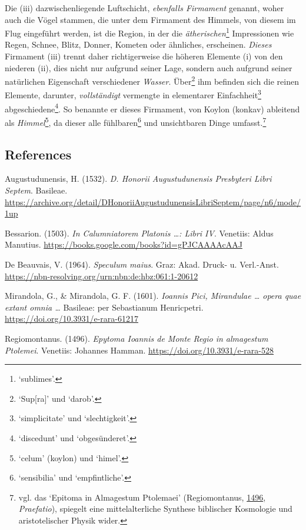 \documentclass[
]{article}
\begin{document}
Die (iii) dazwischenliegende Luftschicht, \emph{ebenfalls Firmament}
genannt, woher auch die Vögel stammen, die unter dem Firmament des
Himmels, von diesem im Flug eingeführt werden, ist die Region, in der
die \emph{ätherischen}\footnote{`sublimes'.} Impressionen wie Regen,
Schnee, Blitz, Donner, Kometen oder ähnliches, erscheinen. \emph{Dieses}
Firmament (iii) trennt daher richtigerweise die höheren Elemente (i) von
den niederen (ii), dies nicht nur aufgrund seiner Lage, sondern auch
aufgrund seiner natürlichen Eigenschaft verschiedener \emph{Wasser}.
Über\footnote{`Sup{[}ra{]}' und `darob'.} ihm befinden sich die reinen
Elemente, darunter, \emph{vollständigt} vermengte in elementarer
Einfachheit\footnote{`simplicitate' und `slechtigkeit'.}
abgeschiedene\footnote{`discedunt' und `obgesünderet'.}. So benannte er
dieses Firmament, von Koylon (konkav) ableitend als
\emph{Himmel}\footnote{`celum' (koylon) und `himel'.}, da dieser alle
fühlbaren\footnote{`sensibilia' und `empfintliche'.} und unsichtbaren
Dinge umfasst.\footnote{vgl. das `Epitoma in Almagestum Ptolemaei'
  (Regiomontanus, \href{https://doi.org/10.3931/e-rara-528}{1496},
  \emph{Praefatio}), spiegelt eine mittelalterliche Synthese biblischer
  Kosmologie und aristotelischer Physik wider.}

\hypertarget{references}{%
\subsection{References}\label{references}}

Augustudunensis, H. (1532). \emph{D. Honorii Augustudunensis Presbyteri
Libri Septem}. Basileae.
\url{https://archive.org/detail/DHonoriiAugustudunensisLibriSeptem/page/n6/mode/1up}

Bessarion. (1503). \emph{In Calumniatorem Platonis \ldots: Libri IV}.
Venetiis: Aldus Manutius.
\url{https://books.google.com/books?id=gPJCAAAAcAAJ}

De Beauvais, V. (1964). \emph{Speculum maius}. Graz: Akad. Druck- u.
Verl.-Anst. \url{https://nbn-resolving.org/urn:nbn:de:hbz:061:1-20612}

Mirandola, G., \& Mirandola, G. F. (1601). \emph{Ioannis Pici,
Mirandulae \ldots{} opera quae extant omnia \ldots{}} Basileae: per
Sebastianum Henricpetri. \url{https://doi.org/10.3931/e-rara-61217}

Regiomontanus. (1496). \emph{Epytoma Ioannis de Monte Regio in
almagestum Ptolemei}. Venetiis: Johannes Hamman.
\url{https://doi.org/10.3931/e-rara-528}
\end{document}
